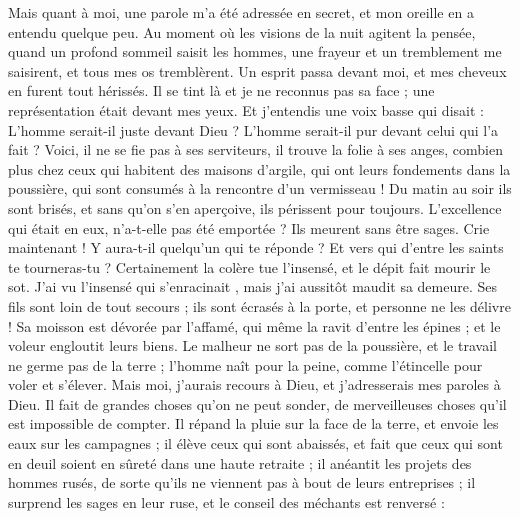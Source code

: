 \begin{multicols}{2}
Mais quant à moi, une parole m'a été adressée en secret, et mon oreille en a entendu quelque peu.
Au moment où les visions de la nuit agitent la pensée, quand un profond sommeil saisit les hommes,
une frayeur et un tremblement me saisirent, et tous mes os tremblèrent.
Un esprit passa devant moi, et mes cheveux en furent tout hérissés. 
Il se tint là et je ne reconnus pas sa face ; une représentation était devant mes yeux. Et j'entendis une voix basse qui disait :
L'homme serait-il juste devant Dieu ? L'homme serait-il pur devant celui qui l'a fait ?
Voici, il ne se fie pas à ses serviteurs, il trouve la folie à ses anges,
combien plus chez ceux qui habitent des maisons d'argile, qui ont leurs fondements dans la poussière, qui sont consumés à la rencontre d'un vermisseau  !
Du matin au soir ils sont brisés, et sans qu'on s'en aperçoive, ils périssent pour toujours. 
L'excellence qui était en eux, n'a-t-elle pas été emportée ? Ils meurent sans être sages. 
\VerseOne{}Crie maintenant ! Y aura-t-il quelqu'un qui te réponde ? Et vers qui d'entre les saints te tourneras-tu ?
Certainement la colère tue l'insensé, et le dépit fait mourir le sot.
J'ai vu l'insensé qui s'enracinait , mais j'ai aussitôt maudit sa demeure.
Ses fils sont loin de tout secours ; ils sont écrasés à la porte, et personne ne les délivre !
Sa moisson est dévorée par l'affamé, qui même la ravit d'entre les épines ; et le voleur engloutit leurs biens.
Le malheur ne sort pas de la poussière, et le travail ne germe pas de la terre ;
l'homme naît pour la peine, comme l'étincelle pour voler et s'élever.
Mais moi, j'aurais recours à Dieu, et j'adresserais mes paroles à Dieu.
Il fait de grandes choses qu'on ne peut sonder, de merveilleuses choses qu'il est impossible de compter.
Il répand la pluie sur la face de la terre, et envoie les eaux sur les campagnes ;
il élève ceux qui sont abaissés, et fait que ceux qui sont en deuil soient en sûreté dans une haute retraite ;
il anéantit les projets des hommes rusés, de sorte qu'ils ne viennent pas à bout de leurs entreprises ;
il surprend les sages en leur ruse, et le conseil des méchants est renversé :

\end{multicols}

